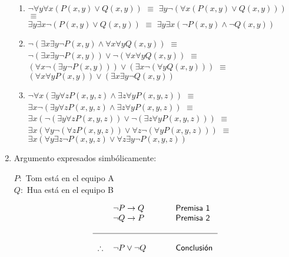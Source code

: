 \documentclass[10pt]{report}
\begin{document}
\begin{enumerate}
\begin{enumerate}
	        \item 
	        $\neg \forall y \forall x (P(x,y) \lor Q(x,y))$
	            $\equiv$
            $\exists y \neg (\forall x (P(x,y) \lor Q(x,y)))$
	            $\equiv$ 
            \\
	        $\exists y \exists x \neg (P(x,y) \lor Q(x,y))$
	            $\equiv$
	        $\exists y \exists x ( \neg P(x,y) \land \neg Q(x,y))$
	        \\
	        
	        \item 
	        $\neg (\exists x \exists y \neg P(x,y) \land \forall x \forall y Q(x,y))$
	            $\equiv$
            $\neg (\exists x \exists y \neg P(x,y)) \lor \neg(\forall x \forall y Q(x,y))$
	            $\equiv$ 
            \\
            $(\forall x \neg (\exists y \neg P(x,y))) \lor (\exists x \neg(\forall y Q(x,y)))$
	            $\equiv$
            $(\forall x \forall y P(x,y)) \lor (\exists x \exists y \neg Q(x,y))$
	        \\
	        
	        \item 
	        $\neg \forall x(\exists y \forall z P(x,y,z) \land \exists z \forall y P(x,y,z))$
	            $\equiv$
            $\exists x \neg (\exists y \forall z P(x,y,z) \land \exists z \forall y P(x,y,z))$
	            $\equiv$
            \\
            $\exists x (\neg (\exists y \forall z P(x,y,z)) \lor \neg (\exists z \forall y P(x,y,z)))$
	            $\equiv$
            $\exists x (\forall y \neg (\forall z P(x,y,z)) \lor \forall z \neg (\forall y P(x,y,z)))$
	            $\equiv$
            \\
            $\exists x (\forall y \exists z \neg P(x,y,z) \lor \forall z \exists y \neg P(x,y,z))$
	        
        \end{enumerate}
        
	\item Argumento expresados simbólicamente:
	
	\begin{center}
	    $P:$ Tom está en el equipo A \\
	    $Q:$ Hua está en el equipo B
	\end{center}
	
	\[
        \begin{tabular}{ clccl}
        	& $\neg P \rightarrow Q$ &  && \textsf{Premisa 1}\\
        	& $\neg Q \rightarrow P$ &  && \textsf{Premisa 2}\\
        	& & && \\
        	\hline \\
        	$\therefore$ & $\neg P \lor \neg Q$ & && \textsf{Conclusi\'{o}n}\\
        \end{tabular}
    \]
    

\end{enumerate}
\end{document}
